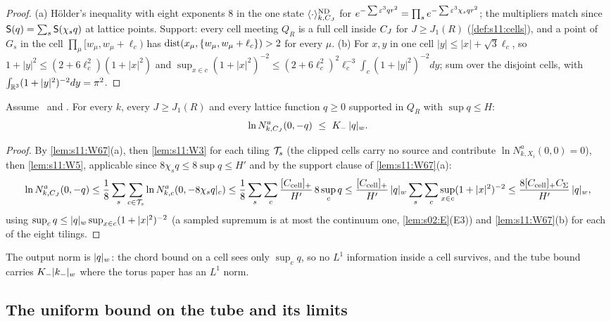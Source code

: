 \begin{proof}
(a) H\"older's inequality with eight exponents $8$ in the one state $\langle\cdot\rangle^{\mathrm{ND}}_{k,C_J}$ for $e^{-\sum\varepsilon^3qr^2}=\prod_se^{-\sum\varepsilon^3\chi_sqr^2}$; the multipliers match since $\mathsf S(q)=\sum_s\mathsf S(\chi_sq)$ at lattice points. Support: every cell meeting $Q_R$ is a full cell inside $C_J$ for $J\ge J_1(R)$ (\cref{def:s11:cells}), and a point of $G_s$ in the cell $\prod_\mu[w_\mu,w_\mu+\ell_c)$ has $\operatorname{dist}(x_\mu,\{w_\mu,w_\mu+\ell_c\})>2$ for every $\mu$. (b) For $x,y$ in one cell $|y|\le|x|+\sqrt3\ell_c$, so $1+|y|^2\le(2+6\ell_c^2)(1+|x|^2)$ and $\sup_{x\in c}(1+|x|^2)^{-2}\le(2+6\ell_c^2)^2\ell_c^{-3}\int_c(1+|y|^2)^{-2}dy$; sum over the disjoint cells, with $\int_{\mathbb R^3}(1+|y|^2)^{-2}dy=\pi^2$.
\end{proof}

\begin{proposition}\label{prop:s11:W8}
Assume \Itwo\ and \Ithree. For every $k$, every $J\ge J_1(R)$ and every lattice function $q\ge0$ supported in $Q_R$ with $\sup q\le H$:
\[
\ln N^a_{k,\CJ}(0,-q)\ \le\ K_-\,\wnorm{q}.
\]
\end{proposition}

\begin{proof}
By \cref{lem:s11:W67}(a), then \cref{lem:s11:W3} for each tiling $\mathcal T_s$ (the clipped cells carry no source and contribute $\ln N^a_{k,X_i}(0,0)=0$), then \cref{lem:s11:W5}, applicable since $8\chi_sq\le8\sup q\le H'$ and by the support clause of \cref{lem:s11:W67}(a):
\[
\ln N^a_{k,C_J}(0,-q)\le\frac18\sum_s\sum_{c\in\mathcal T_s}\ln N^a_{k,c}(0,-8\chi_sq|_c)\le\frac18\sum_s\sum_c\frac{[C_{\rm cell}]_+}{H'}\,8\sup_cq\le\frac{[C_{\rm cell}]_+}{H'}\,\lvert q\rvert_{w}\sum_s\sum_c\sup_{x\in c}(1+|x|^2)^{-2}\le\frac{8[C_{\rm cell}]_+C_\Sigma}{H'}\,\lvert q\rvert_{w},
\]
using $\sup_cq\le\lvert q\rvert_{w}\sup_{x\in c}(1+|x|^2)^{-2}$ (a sampled supremum is at most the continuum one, \cref{lem:s02:E}(E3)) and \cref{lem:s11:W67}(b) for each of the eight tilings.
\end{proof}

The output norm is $\lvert q\rvert_{w}$: the chord bound on a cell sees only $\sup_cq$, so no $L^1$ information inside a cell survives, and the tube bound carries $K_-\lvert k_-\rvert_{w}$ where the torus paper \cite{SymPhase} has an $L^1$ norm.

\subsection{The uniform bound on the tube and its limits}

